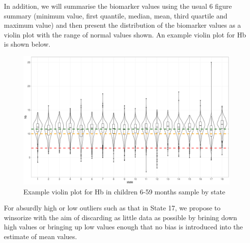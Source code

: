 \documentclass[12pt,a4paper]{article}
\begin{document}
In addition, we will summarise the biomarker values using the usual 6 figure summary (minimum value, first quantile, median, mean, third quartile and maximum value) and then present the distribution of the biomarker values as a violin plot with the range of normal values shown. An example violin plot for Hb is shown below.

\begin{figure}[H]

{\centering \includegraphics{sudanMNindicators_files/figure-latex/violin-1} 

}

\caption{Example violin plot for Hb in children 6-59 months sample by state}\label{fig:violin}
\end{figure}

For absurdly high or low outliers such as that in State 17, we propose to winsorize with the aim of discarding as little data as possible by brining down high values or bringing up low values enough that no bias is introduced into the estimate of mean values.

\newpage

\renewcommand\refname{References}

\end{document}
